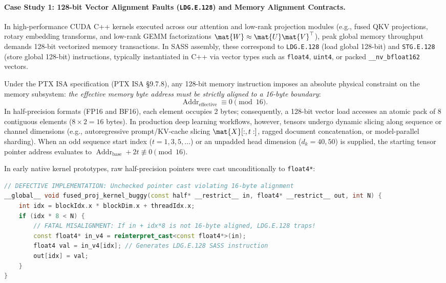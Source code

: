 \paragraph{Case Study 1: 128-bit Vector Alignment Faults (\texttt{LDG.E.128}) and Memory Alignment Contracts.}
\label{sec:case_study_vector_alignment}
In high-performance CUDA C++ kernels executed across our attention and low-rank projection modules (e.g., fused QKV projections, rotary embedding transforms, and low-rank GEMM factorizations $\mat{W} \approx \mat{U}\mat{V}^\top$), peak global memory throughput demands 128-bit vectorized memory transactions. In SASS assembly, these correspond to \texttt{LDG.E.128} (load global 128-bit) and \texttt{STG.E.128} (store global 128-bit) instructions, typically instantiated in C++ via vector types such as \texttt{float4}, \texttt{uint4}, or packed \texttt{\_\_nv\_bfloat162} vectors.

Under the PTX ISA specification (PTX ISA \S{9.7.8}), any 128-bit memory instruction imposes an absolute physical constraint on the memory subsystem: \emph{the effective memory byte address must be strictly aligned to a 16-byte boundary}:
\begin{equation}
    \operatorname{Addr}_{\text{effective}} \equiv 0 \pmod{16}.
\end{equation}
In half-precision formats (FP16 and BF16), each element occupies 2 bytes; consequently, a 128-bit vector load accesses an atomic pack of 8 contiguous elements ($8 \times 2 = 16$ bytes). In production deep learning workflows, however, tensors undergo dynamic slicing along sequence or channel dimensions (e.g., autoregressive prompt/KV-cache slicing $\mat{X}[:, t:]$, ragged document concatenation, or model-parallel sharding). When an odd sequence start index ($t = 1, 3, 5, \dots$) or an unpadded head dimension ($d_k = 40, 50$) is supplied, the starting tensor pointer address evaluates to $\operatorname{Addr}_{\text{base}} + 2t \not\equiv 0 \pmod{16}$.

In early \neuralops{} native kernel prototypes, raw half-precision pointers were cast unconditionally to \texttt{float4*}:
\begin{lstlisting}[language=C++]
// DEFECTIVE IMPLEMENTATION: Unchecked pointer cast violating 16-byte alignment
__global__ void fused_proj_kernel_buggy(const half* __restrict__ in, float4* __restrict__ out, int N) {
    int idx = blockIdx.x * blockDim.x + threadIdx.x;
    if (idx * 8 < N) {
        // FATAL MISALIGNMENT: If in + idx*8 is not 16-byte aligned, LDG.E.128 traps!
        const float4* in_v4 = reinterpret_cast<const float4*>(in);
        float4 val = in_v4[idx]; // Generates LDG.E.128 SASS instruction
        out[idx] = val;
    }
}
\end{lstlisting}

